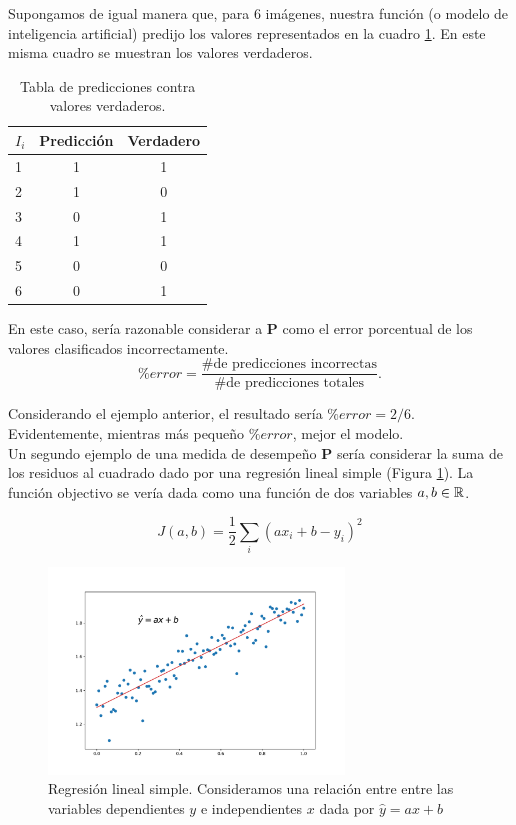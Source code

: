 \documentclass[11pt]{article}
\begin{document}
Supongamos de igual manera que, para 6 imágenes, nuestra función (o modelo de inteligencia artificial) predijo los valores representados en la cuadro \ref{table:classtable}. En este misma cuadro se muestran los valores verdaderos.

\begin{table}[h!]
\centering
\begin{tabular}{l|cc}
  $I_i$ & Predicción & Verdadero \\
  \hline
  1& 1& 1\\
  2& 1& 0\\
  3& 0& 1\\
  4& 1& 1\\
  5& 0& 0\\
  6& 0& 1
\end{tabular}
\caption{Tabla de predicciones contra valores verdaderos.}
\label{table:classtable}
\end{table}

En este caso, sería razonable considerar a \textbf{P} como el error porcentual de los valores clasificados incorrectamente.
\begin{equation}
	\%error = \frac{\# \mbox{de predicciones incorrectas}}{\# \mbox{de predicciones totales}}.
\end{equation}

Considerando el ejemplo anterior, el resultado sería $\%error = 2/6$. Evidentemente, mientras más pequeño $\%error$, mejor el modelo.\\

Un segundo ejemplo de una medida de desempeño \textbf{P} sería considerar la suma de los residuos al cuadrado dado por una regresión lineal simple (Figura \ref{fig:simple_lreg}). La función objectivo se vería dada como una función de dos variables $a, b \in \mathbb{R}$.

\begin{equation} \label{eq:simple_lreg}
	J(a, b) = \frac{1}{2}\sum_i(ax_i + b - y_i)^2
\end{equation}

\begin{figure}[h!]
	\centering
	\includegraphics[width=0.7\textwidth]{lreg}
\caption{Regresión lineal simple. Consideramos una relación entre entre las variables dependientes $y$ e independientes $x$ dada por $\hat y = ax + b$}
\label{fig:simple_lreg}
\end{figure}
\end{document}
